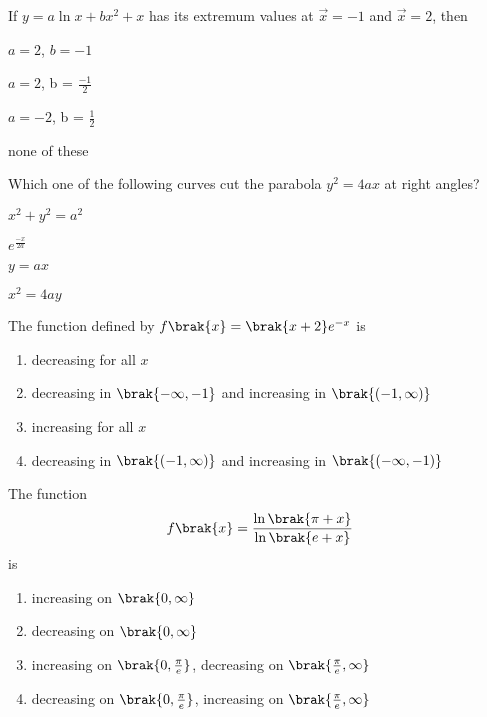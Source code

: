 \item If $y=a\ln x + bx^2 +x$ has its extremum values at 
$\vec x = -1$ and $\vec x = 2$, then


\hfill{}

\begin{enumerate}
\begin{multicols}{2}
	\item $ a = 2$, $b = -1$
	\item $a = 2$, b = $\frac{-1}{2}$
	\item $a = -2$, b = $\frac{1}{2}$
	\item none of these
\end{multicols}
\end{enumerate}

\item Which one of the following curves cut the parabola
$y^2 = 4ax$ at right angles?
\hfill{}
\begin{enumerate}
\begin{multicols}{2}
	\item $x^2 + y^2 = a^2$
        \item $e^{\frac{-x}{2a}}$
	\item $y = ax$
	\item $x^2 = 4ay$
\end{multicols}
\end{enumerate}

\item The function defined by 
$f\brak{x} = \brak{x+2}e^{-x}$ is
\hfill{}
\begin{enumerate}
	\item decreasing for all $x$
	\item decreasing in $\brak{-\infty, -1}$ and increasing
		in $\brak{(-1, \infty)}$
        \item increasing for all $x$
	\item decreasing in $\brak{(-1, \infty)}$ and increasing
		in $\brak{(-\infty, -1)}$
\end{enumerate}

\item The function 
\begin{align*}
		f\brak{x} =\frac{\ln \brak{\pi + x}}{\ln \brak{e + x}}
\end{align*} is
\hfill{}

\begin{enumerate}
	\item increasing on $\brak{0, \infty}$
	\item decreasing on $\brak{0, \infty}$
	\item increasing on $\brak{0, \frac{\pi}{e}}$,
		decreasing on $\brak{\frac{\pi}{e}, \infty}$
	\item decreasing on $\brak{0, \frac{\pi}{e}}$,
		increasing on $\brak{\frac{\pi}{e}, \infty}$
\end{enumerate}

